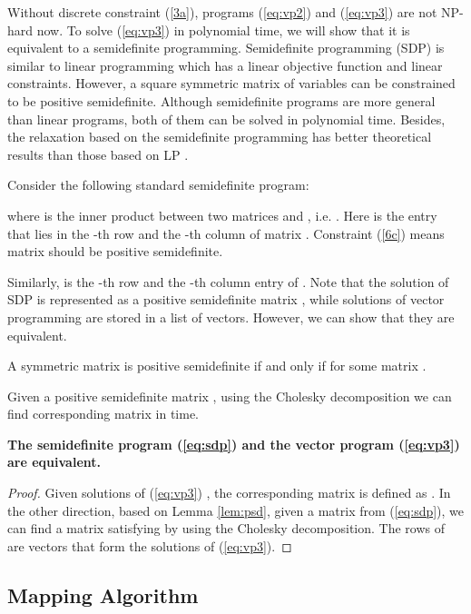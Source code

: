\documentclass[10pt,conference]{IEEEtran}
\begin{document}
Without discrete constraint (\ref{3a}), programs (\ref{eq:vp2}) and (\ref{eq:vp3}) are not NP-hard now.
To solve (\ref{eq:vp3}) in polynomial time, we will show that it is equivalent to a semidefinite programming.
Semidefinite programming (SDP) is similar to linear programming which has a linear objective function and linear constraints.
However, a square symmetric matrix of variables can be constrained to be positive semidefinite.
Although semidefinite programs are more general than linear programs, both of them can be solved in polynomial time.
Besides, the relaxation based on the semidefinite programming has better theoretical results than those based on LP \cite{SDP_1996Boyed}.



Consider the following standard semidefinite program:

where  is the inner product between two matrices  and , i.e. .
Here  is the entry that lies in the -th row and the -th column of matrix .
Constraint (\ref{6c}) means matrix  should be positive semidefinite.


Similarly,  is the -th row and the -th column entry of .
Note that the solution of SDP is represented as a positive semidefinite matrix , while solutions of vector programming are stored in a list of vectors.
However, we can show that they are equivalent.

\begin{lemma}
\label{lem:psd}
A symmetric matrix  is positive semidefinite if and only if  for some matrix . 
\end{lemma}

Given a positive semidefinite matrix , using the Cholesky decomposition we can find corresponding matrix  in  time.

\begin{theorem}
\textbf{The semidefinite program (\ref{eq:sdp}) and the vector program (\ref{eq:vp3}) are equivalent.}
\end{theorem}
\begin{proof}
Given solutions of (\ref{eq:vp3}) , the corresponding matrix  is defined as .
In the other direction, based on Lemma \ref{lem:psd}, given a matrix  from (\ref{eq:sdp}),  we can find a matrix  satisfying  by using the Cholesky decomposition.
The rows of  are vectors  that form the solutions of (\ref{eq:vp3}).
\end{proof}




\subsection{Mapping Algorithm}
\end{document}

